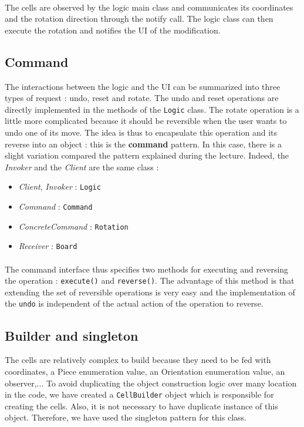 \documentclass[a4paper,11pt]{article}
\begin{document}
\paragraph{}
The cells are observed by the logic main class and communicates its coordinates and the rotation direction through the notify call. The logic class can then execute the rotation and notifies the UI of the modification.
\subsection{Command}
The interactions between the logic and the UI can be summarized into three types of request : undo, reset and rotate.  The undo and reset operations are directly implemented in the methods of the \texttt{Logic} class. The rotate operation is a little more complicated because it should be reversible when the user wants to undo one of its move. The idea is thus to encapsulate this operation and its reverse into an object : this is the \textbf{command} pattern. In this case, there is a slight variation compared the pattern explained during the lecture. Indeed, the \textit{Invoker} and the \textit{Client} are the same class : \\
\begin{itemize}
	\item \textit{Client}, \textit{Invoker} : \texttt{Logic}
	\item \textit{Command} : \texttt{Command}
	\item \textit{ConcreteCommand} : \texttt{Rotation}
	\item \textit{Receiver} : \texttt{Board}
\end{itemize}
\paragraph{}
The command interface thus specifies two methods for executing and reversing the operation : \texttt{execute()} and \texttt{reverse()}. The advantage of this method is that extending the set of reversible operations is very easy and the implementation of the \texttt{undo} is independent of the actual action of the operation to reverse. 
\subsection{Builder and singleton}
The cells are relatively complex to build because they need to be fed with coordinates, a Piece enumeration value, an Orientation enumeration value, an observer,... To avoid duplicating the object construction logic over many location in the code, we have created a \texttt{CellBuilder} object which is responsible for creating the cells. Also, it is not necessary to have duplicate instance of this object. Therefore, we have used the singleton pattern for this class.
\label{sec:patterns}
\end{document}
